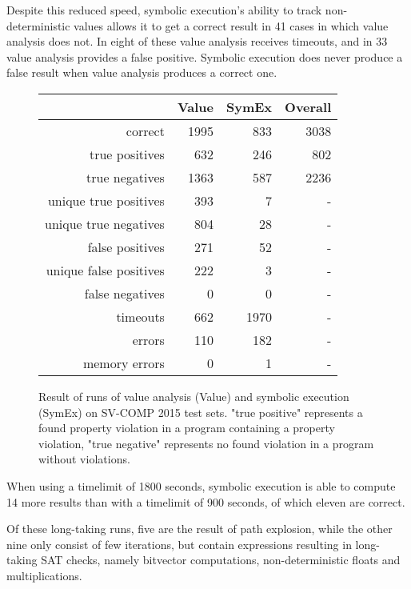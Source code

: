 Despite this reduced speed, symbolic execution's ability to track non-deterministic values allows it to get a correct result in 41 cases in which value analysis does not. In eight of these value analysis receives timeouts, and in 33 value analysis provides a false positive. Symbolic execution does never produce a false result when value analysis produces a correct one.
\begin{figure}
\begin{tabular}{| r || r | r | r |}
\hline
                     & Value & SymEx & Overall \\ \hline
correct                & 1995 &  833 & 3038 \\ \hline
true positives         &  632 &  246 &  802 \\ \hline
true negatives         & 1363 &  587 & 2236 \\ \hline
unique true positives  &  393 &    7 &    - \\ \hline
unique true negatives  &  804 &   28 &    - \\ \hline
false positives        &  271 &   52 &    - \\ \hline
unique false positives &  222 &    3 &    - \\ \hline
false negatives        &    0 &    0 &    - \\ \hline 
timeouts               &  662 & 1970 &    - \\ \hline
errors                 &  110 &  182 &    - \\ \hline
memory errors          &    0 &    1 &    - \\ \hline
\end{tabular}
\label{tab:diff}
\caption{Result of runs of value analysis (Value) and symbolic execution (SymEx) on SV-COMP 2015 test sets.
  "true positive" represents a found property violation in a program containing a property violation,
  "true negative" represents no found violation in a program without violations.}
\end{figure}

When using a timelimit of 1800 seconds, symbolic execution is able to compute 14 more results than with a timelimit of 900 seconds, of which eleven are correct.

Of these long-taking runs, five are the result of path explosion,
while the other nine only consist of few iterations, but contain expressions resulting in long-taking SAT checks, namely bitvector computations, non-deterministic floats and multiplications.

